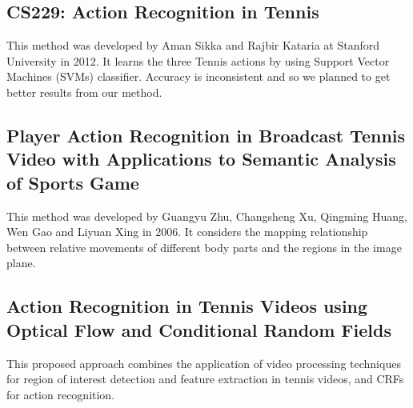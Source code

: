 \documentclass[10.5pt]{proc}
\begin{document}
    \subsection{CS229: Action Recognition in Tennis\cite{stanford2012}}
        This method was developed by Aman Sikka and Rajbir Kataria at Stanford University in 2012. It learns the three Tennis actions by using Support Vector Machines (SVMs) classifier. Accuracy is inconsistent and so we planned to get better results from our method.
    \subsection{Player Action Recognition in Broadcast Tennis Video with Applications to Semantic Analysis of Sports Game\cite{asians}}
    This method was developed by Guangyu Zhu, Changsheng Xu, Qingming Huang, Wen Gao and Liyuan Xing in 2006. It considers the mapping relationship between relative movements of different body parts and the regions in the image plane.
    \subsection{Action Recognition in Tennis Videos using Optical Flow and Conditional Random Fields\cite{argentina}}
    This proposed approach combines the application of video processing techniques for region of interest detection and feature extraction in tennis videos, and CRFs for action recognition.\\
    \\
\end{document}
